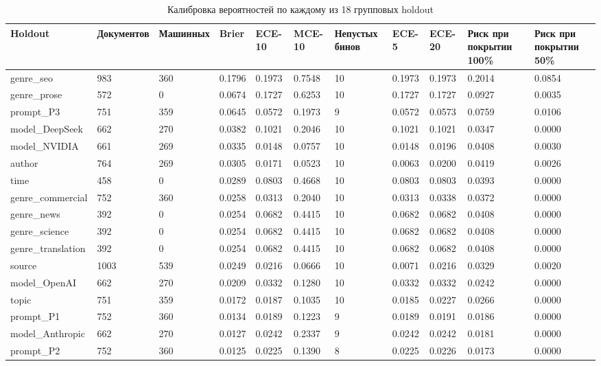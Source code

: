 \begin{table}
\centering
\scriptsize
\caption{Калибровка вероятностей по каждому из 18 групповых holdout}
\label{tab:s6}
\begin{tabular}{lllllllllll}
\toprule
Holdout & Документов & Машинных & Brier & ECE-10 & MCE-10 & Непустых бинов & ECE-5 & ECE-20 & Риск при покрытии 100\% & Риск при покрытии 50\% \\
\midrule
genre\_seo & 983 & 360 & 0.1796 & 0.1973 & 0.7548 & 10 & 0.1973 & 0.1973 & 0.2014 & 0.0854 \\
genre\_prose & 572 & 0 & 0.0674 & 0.1727 & 0.6253 & 10 & 0.1727 & 0.1727 & 0.0927 & 0.0035 \\
prompt\_P3 & 751 & 359 & 0.0645 & 0.0572 & 0.1973 & 9 & 0.0572 & 0.0573 & 0.0759 & 0.0106 \\
model\_DeepSeek & 662 & 270 & 0.0382 & 0.1021 & 0.2046 & 10 & 0.1021 & 0.1021 & 0.0347 & 0.0000 \\
model\_NVIDIA & 661 & 269 & 0.0335 & 0.0148 & 0.0757 & 10 & 0.0148 & 0.0196 & 0.0408 & 0.0030 \\
author & 764 & 269 & 0.0305 & 0.0171 & 0.0523 & 10 & 0.0063 & 0.0200 & 0.0419 & 0.0026 \\
time & 458 & 0 & 0.0289 & 0.0803 & 0.4668 & 10 & 0.0803 & 0.0803 & 0.0393 & 0.0000 \\
genre\_commercial & 752 & 360 & 0.0258 & 0.0313 & 0.2040 & 10 & 0.0313 & 0.0338 & 0.0372 & 0.0000 \\
genre\_news & 392 & 0 & 0.0254 & 0.0682 & 0.4415 & 10 & 0.0682 & 0.0682 & 0.0408 & 0.0000 \\
genre\_science & 392 & 0 & 0.0254 & 0.0682 & 0.4415 & 10 & 0.0682 & 0.0682 & 0.0408 & 0.0000 \\
genre\_translation & 392 & 0 & 0.0254 & 0.0682 & 0.4415 & 10 & 0.0682 & 0.0682 & 0.0408 & 0.0000 \\
source & 1003 & 539 & 0.0249 & 0.0216 & 0.0666 & 10 & 0.0071 & 0.0216 & 0.0329 & 0.0020 \\
model\_OpenAI & 662 & 270 & 0.0209 & 0.0332 & 0.1280 & 10 & 0.0332 & 0.0332 & 0.0242 & 0.0000 \\
topic & 751 & 359 & 0.0172 & 0.0187 & 0.1035 & 10 & 0.0185 & 0.0227 & 0.0266 & 0.0000 \\
prompt\_P1 & 752 & 360 & 0.0134 & 0.0189 & 0.1223 & 9 & 0.0189 & 0.0191 & 0.0186 & 0.0000 \\
model\_Anthropic & 662 & 270 & 0.0127 & 0.0242 & 0.2337 & 9 & 0.0242 & 0.0242 & 0.0181 & 0.0000 \\
prompt\_P2 & 752 & 360 & 0.0125 & 0.0225 & 0.1390 & 8 & 0.0225 & 0.0226 & 0.0173 & 0.0000 \\

\end{tabular}
\end{table}
